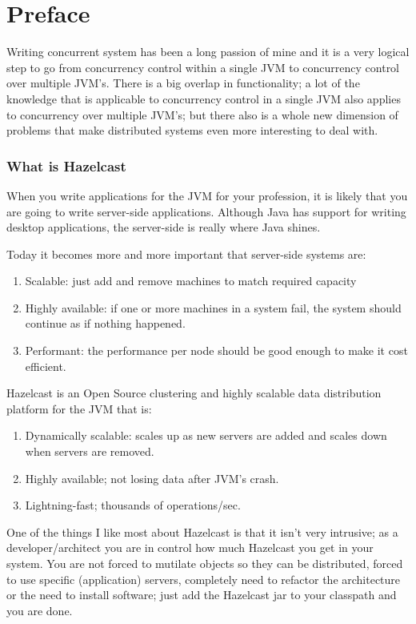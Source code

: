 \chapter*{Preface}

Writing concurrent system has been a long passion of mine and it is a very logical step to go from concurrency control within a single JVM to concurrency control over multiple JVM's. There is a big overlap in functionality; a lot of the knowledge that is applicable to concurrency control in a single JVM also applies to concurrency over multiple JVM's; but there also is a whole new dimension of problems that make distributed systems even more interesting to deal with. 

\subsection*{What is Hazelcast}
When you write applications for the JVM for your profession, it is likely that you are going to write server-side applications. Although Java has support for writing desktop applications, the server-side is really where Java shines.

Today it becomes more and more important that server-side systems are:
\begin{enumerate}
\item Scalable: just add and remove machines to match required capacity 
\item Highly available: if one or more machines in a system fail, the system should continue as if nothing happened.
\item Performant: the performance per node should be good enough to make it cost efficient.
\end{enumerate}

Hazelcast is an Open Source clustering and highly scalable data distribution platform for the JVM that is:
\begin{enumerate}
\item Dynamically scalable: scales up as new servers are added and scales down when servers are removed.
\item Highly available; not losing data after JVM's crash.
\item Lightning-fast; thousands of operations/sec.
\end{enumerate}
	
One of the things I like most about Hazelcast is that it isn't very intrusive; as a developer/architect you are in control how much Hazelcast you get in your system. You are not forced to mutilate objects so they can be distributed, forced to use specific (application) servers, completely need to refactor the architecture or the need to install software; just add the Hazelcast jar to your classpath and you are done.

